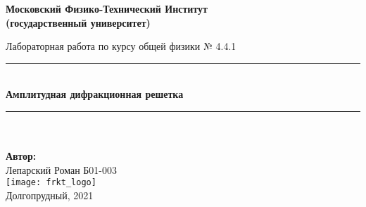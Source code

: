 \newcommand{\HRule}{\rule{\linewidth}{0.7mm}} %
	
	\begin{center}
		\large\textbf{Московский Физико-Технический Институт}\\ %
		\large\textbf{(государственный университет)}
	
		\vfill
		
		\Large Лабораторная работа по курсу общей физики № 4.4.1\\[0.5cm] %
		
		
		\HRule
		\\[0.4cm]
		{ \huge \bfseries Амплитудная дифракционная решетка}%
		\\[0.4cm] 
		\HRule
		\\[0.5cm]
		
		\ \\
	\textbf{\large Автор:} \\	
	\large Лепарский Роман Б01-003\\ %
		\vfill
		\hspace*{-0.8 cm}\texttt{[image: frkt\_logo]}\\ %
		\large Долгопрудный, 2021 %
	\end{center}

\newpage
\setcounter{page}{2}
\fancyfoot[c]{\thepage}
\fancyhead[R]{}